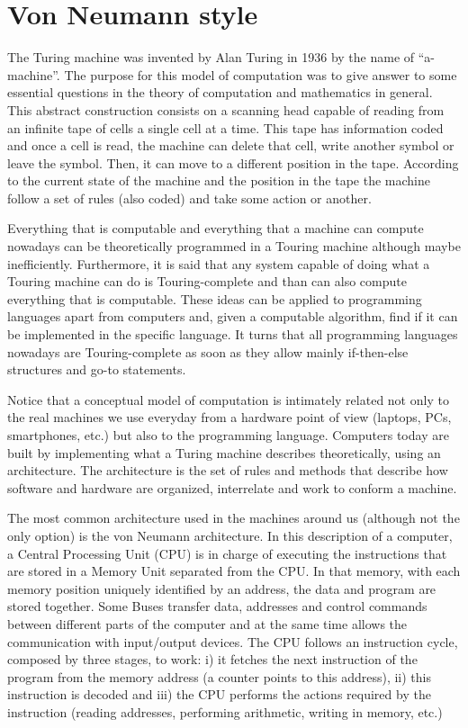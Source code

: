  
\newpage   
    \section{Von Neumann style} 
\vspace{-0.3cm}
The Turing machine was invented by Alan Turing in 1936 by the name of ``a-machine''. 
The purpose for this model of computation was to give answer to some essential questions 
in the theory of computation and mathematics in general. 
This abstract construction consists on a scanning head capable of reading from an 
infinite tape of cells a single cell at a time. 
This tape has information coded and once a cell is read, the machine can delete that cell, 
write another symbol or leave the symbol. 
Then, it can move to a different position in the tape. 
According to the current state of the 
machine and the position in the tape the machine follow a set of rules (also coded) and take some action or another. 

Everything that is computable and everything that a machine can compute nowadays can be theoretically programmed in a Touring machine 
although maybe inefficiently. 
Furthermore, it is said that any system capable of doing what a Touring machine can do is Touring-complete and 
than can also compute everything that is computable. 
These ideas can be applied to programming languages apart from computers and,
given a computable algorithm, find if it can be implemented in the specific language.
It turns that all programming languages nowadays are Touring-complete as soon as they allow 
mainly if-then-else structures and go-to statements. 

Notice that a conceptual model of computation is intimately related not only to the 
real machines we use everyday from a hardware point of view (laptops, PCs, smartphones, etc.) 
but also to the programming language. 
Computers today are built by implementing what 
a Turing machine describes theoretically, using an architecture. 
The architecture is the set of rules and methods that describe how software 
and hardware are organized, interrelate and work to conform a machine.

The most common architecture used in the machines around us (although not the only option) is the von Neumann architecture. 
In this description of a computer, a Central Processing Unit (CPU) is in charge of executing the instructions that are stored in a Memory Unit separated from the CPU. 
In that memory, with each memory position uniquely identified by an address, the data and program are stored together. 
Some Buses transfer data, addresses and control commands between different parts of the computer
and at the same time allows the communication with input/output devices.
The CPU follows an instruction cycle, composed by three stages, to work: 
i) it fetches the next instruction of the program from the memory address (a counter points to this address), 
ii) this instruction is decoded and 
iii) the CPU performs the actions required by the instruction (reading addresses, performing arithmetic, writing in memory, etc.)


